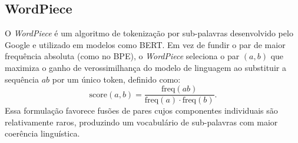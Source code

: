 \subsection*{WordPiece}
\label{sec:wordpiece}

O \textit{WordPiece} é um algoritmo de tokenização por sub-palavras
desenvolvido pelo Google e utilizado em modelos como BERT. Em vez de fundir
o par de maior frequência absoluta (como no BPE), o \textit{WordPiece}
seleciona o par $(a, b)$ que maximiza o ganho de verossimilhança do modelo
de linguagem ao substituir a sequência $ab$ por um único token, definido como:
\[
  \text{score}(a, b) = \frac{\text{freq}(ab)}{\text{freq}(a) \cdot \text{freq}(b)}.
\]
Essa formulação favorece fusões de pares cujos componentes individuais são
relativamente raros, produzindo um vocabulário de sub-palavras com maior
coerência linguística.
